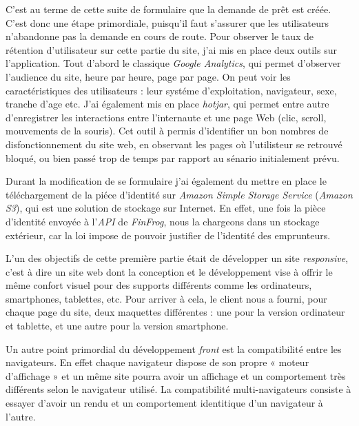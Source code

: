 \documentclass[12pt,a4paper]{article}
\begin{document}
  \bigskip

  C'est au terme de cette suite de formulaire que la demande de prêt est
  créée. C'est donc une étape primordiale, puisqu'il faut s'assurer que
  les utilisateurs n'abandonne pas la demande en cours de route. Pour
  observer le taux de rétention d'utilisateur sur cette partie du site,
  j'ai mis en place deux outils sur l'application. Tout d'abord le
  classique \emph{Google Analytics}, qui permet d'observer l'audience du
  site, heure par heure, page par page. On peut voir les caractéristiques
  des utilisateurs : leur systéme d'exploitation, navigateur, sexe,
  tranche d'age etc. J'ai également mis en place \emph{hotjar}, qui permet
  entre autre d'enregistrer les interactions entre l'internaute et une
  page Web (clic, scroll, mouvements de la souris). Cet outil à permis
  d'identifier un bon nombres de disfonctionnement du site web, en
  observant les pages où l'utilisteur se retrouvé bloqué, ou bien passé
  trop de temps par rapport au sénario initialement prévu.

  \bigskip

  Durant la modification de se formulaire j'ai également du mettre en
  place le téléchargement de la piéce d'identité sur \emph{Amazon Simple
  Storage Service} (\emph{Amazon S3}), qui est une solution de stockage
  sur Internet. En effet, une fois la pièce d'identité envoyée à
  l'\emph{API} de \emph{FinFrog}, nous la chargeons dans un stockage
  extérieur, car la loi impose de pouvoir justifier de l'identité des
  emprunteurs.

  \bigskip

  L'un des objectifs de cette première partie était de développer un site
  \emph{responsive}, c'est à dire un site web dont la conception et le
  développement vise à offrir le même confort visuel pour des supports
  différents comme les ordinateurs, smartphones, tablettes, etc. Pour
  arriver à cela, le client nous a fourni, pour chaque page du site, deux
  maquettes différentes : une pour la version ordinateur et tablette, et
  une autre pour la version smartphone.

  \bigskip

  Un autre point primordial du développement \emph{front} est la
  compatibilité entre les navigateurs. En effet chaque navigateur dispose
  de son propre « moteur d'affichage » et un même site pourra avoir un
  affichage et un comportement très différents selon le navigateur
  utilisé. La compatibilité multi-navigateurs consiste à essayer d'avoir
  un rendu et un comportement identitique d'un navigateur à l'autre.
\end{document}
